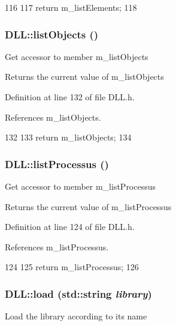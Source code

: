 \begin{DoxyCode}
116                                  {
117     return m_listElements;
118   }
\end{DoxyCode}
\hypertarget{classDLL_a3bde9f46fc00bcc1b0a22558cf0447da}{
\subsubsection[{listObjects}]{ DLL::listObjects ()}}
\label{classDLL_a3bde9f46fc00bcc1b0a22558cf0447da}
Get accessor to member m\_\-listObjects \begin{DoxyReturn}{Returns}
the current value of m\_\-listObjects 
\end{DoxyReturn}


Definition at line 132 of file DLL.h.

References m\_\-listObjects.


\begin{DoxyCode}
132                                {
133     return m_listObjects;
134   }
\end{DoxyCode}
\hypertarget{classDLL_a52eb21bf2ac1a61ae8ae41663ce4c3f8}{
\subsubsection[{listProcessus}]{ DLL::listProcessus ()}}
\label{classDLL_a52eb21bf2ac1a61ae8ae41663ce4c3f8}
Get accessor to member m\_\-listProcessus \begin{DoxyReturn}{Returns}
the current value of m\_\-listProcessus 
\end{DoxyReturn}


Definition at line 124 of file DLL.h.

References m\_\-listProcessus.


\begin{DoxyCode}
124                                    {
125     return m_listProcessus;
126   }
\end{DoxyCode}
\hypertarget{classDLL_a64166d3479edf7e44fd539841e70fb3a}{
\subsubsection[{load}]{ DLL::load (std::string {\em library})}}
\label{classDLL_a64166d3479edf7e44fd539841e70fb3a}
Load the library according to its name 

